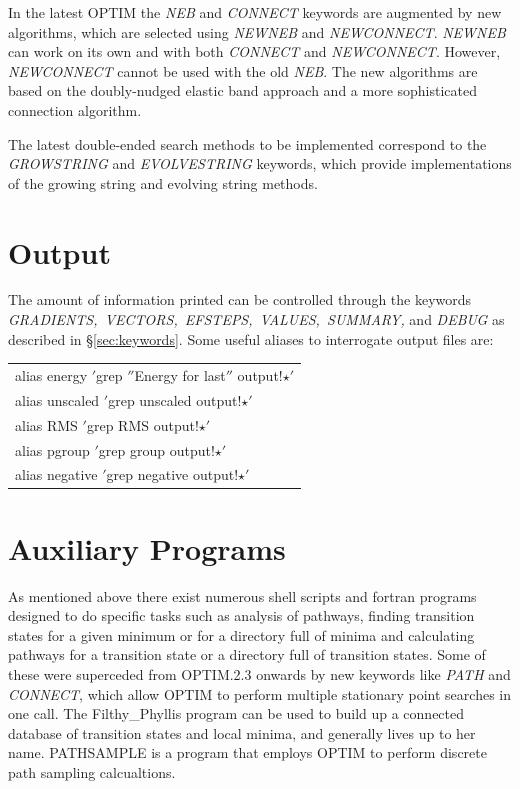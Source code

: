 \documentclass[12pt,a4paper,dvips]{article}
\begin{document}
In the latest OPTIM the {\it NEB\/} and {\it CONNECT\/} keywords are augmented by new algorithms,
which are selected using {\it NEWNEB\/} and {\it NEWCONNECT\/}. {\it NEWNEB\/} can work on its
own and with both {\it CONNECT\/} and {\it NEWCONNECT\/}. However, {\it NEWCONNECT\/}
cannot be used with the old {\it NEB\/}.
The new algorithms are based on the doubly-nudged elastic band approach and a 
more sophisticated connection algorithm.\cite{TrygubenkoW04}

The latest double-ended search methods to be implemented correspond to the
{\it GROWSTRING} and {\it EVOLVESTRING} keywords, which provide implementations of the
growing string and evolving string methods.\cite{ERV02,PetersHBC04}

\section{Output}
\label{sec:output}
The amount of information printed can be controlled
through the keywords {\it GRADIENTS,\ VECTORS,\ EFSTEPS,\ VALUES,\ SUMMARY,\/}
and {\it DEBUG\/} as described in \S\ref{sec:keywords}.
Some useful aliases to interrogate output files are:

\medskip
\begin{tabular}{l}
alias energy $'$grep $''$Energy for last$''$ output!$\star$$'$ \\
alias unscaled $'$grep unscaled output!$\star$$'$ \\
alias RMS $'$grep RMS output!$\star$$'$ \\
alias pgroup $'$grep group output!$\star$$'$ \\
alias negative $'$grep negative output!$\star$$'$ \\
\end{tabular}

\section{Auxiliary Programs}
\label{sec:auxiliary}
As mentioned above there exist numerous shell scripts
and fortran programs designed to do specific tasks such as analysis of pathways,
finding transition states for a given minimum or for a directory full of minima and
calculating pathways for a transition state or a directory full of transition states.
Some of these were superceded from OPTIM.2.3 onwards by new keywords like {\it PATH\/}
and {\it CONNECT\/}, which allow OPTIM to perform multiple stationary point searches 
in one call. The Filthy\_Phyllis program can be used to build up a connected database of
transition states and local minima, and generally lives up to her name.
PATHSAMPLE is a program that employs OPTIM to perform discrete path sampling
calcualtions.\cite{Wales02,Wales03}
\end{document}
